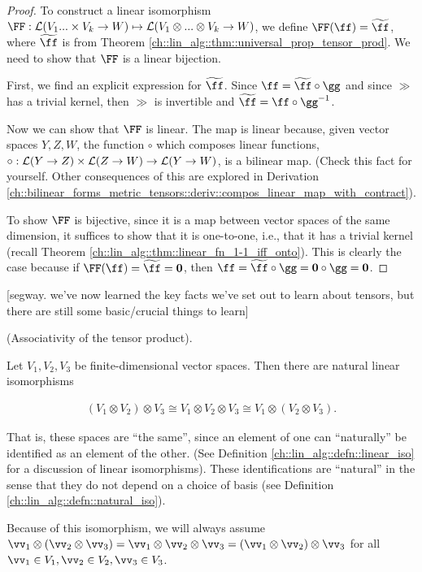 \begin{proof}
    To construct a linear isomorphism $\FF:\LLLL(V_1 ... \times V_k \rightarrow W) \mapsto \LLLL(V_1 \otimes ... \otimes V_k \rightarrow W)$, we define $\FF(\ff) = \widetilde{\ff}$, where $\widetilde{\ff}$ is from Theorem \ref{ch::lin_alg::thm::universal_prop_tensor_prod}. We need to show that $\FF$ is a linear bijection. 
    
    First, we find an explicit expression for $\widetilde{\ff}$. Since $\ff = \widetilde{\ff} \circ \gg$ and since $\gg$ has a trivial kernel, then $\gg$ is invertible and $\widetilde{\ff} = \ff \circ \gg^{-1}$.

    Now we can show that $\FF$ is linear. The map is linear because, given vector spaces $Y, Z, W$, the function $\circ$ which composes linear functions, ${\circ:\mathcal{L}(Y \rightarrow Z) \times \mathcal{L}(Z \rightarrow W) \rightarrow \mathcal{L}(Y \rightarrow W)}$, is a bilinear map. (Check this fact for yourself. Other consequences of this are explored in Derivation \ref{ch::bilinear_forms_metric_tensors::deriv::compos_linear_map_with_contract}). 
    
    To show $\FF$ is bijective, since it is a map between vector spaces of the same dimension, it suffices to show that it is one-to-one, i.e., that it has a trivial kernel (recall Theorem \ref{ch::lin_alg::thm::linear_fn_1-1_iff_onto}). This is clearly the case because if $\FF(\ff) = \widetilde{\ff} = \mathbf{0}$, then $\ff = \widetilde{\ff} \circ \gg = \mathbf{0} \circ \gg = \mathbf{0}$.
\end{proof}

[segway. we've now learned the key facts we've set out to learn about tensors, but there are still some basic/crucial things to learn]

\begin{theorem}    \label{ch::motivated_intro::thm::tensor_product_associative}
    (Associativity of the tensor product). 
    
    Let $V_1, V_2, V_3$ be finite-dimensional vector spaces. Then there are natural linear isomorphisms
    
    \begin{align*}
        (V_1 \otimes V_2) \otimes V_3 \cong V_1 \otimes V_2 \otimes V_3 \cong V_1 \otimes (V_2 \otimes V_3).
    \end{align*}
    
    That is, these spaces are ``the same'', since an element of one can ``naturally'' be identified as an element of the other. (See Definition \ref{ch::lin_alg::defn::linear_iso} for a discussion of linear isomorphisms). These identifications are ``natural'' in the sense that they do not depend on a choice of basis (see Definition \ref{ch::lin_alg::defn::natural_iso}).

    Because of this isomorphism, we will always assume $\vv_1 \otimes (\vv_2 \otimes \vv_3) = \vv_1 \otimes \vv_2 \otimes \vv_3 = (\vv_1 \otimes \vv_2) \otimes \vv_3$ for all $\vv_1 \in V_1, \vv_2 \in V_2, \vv_3 \in V_3$.
\end{theorem}

